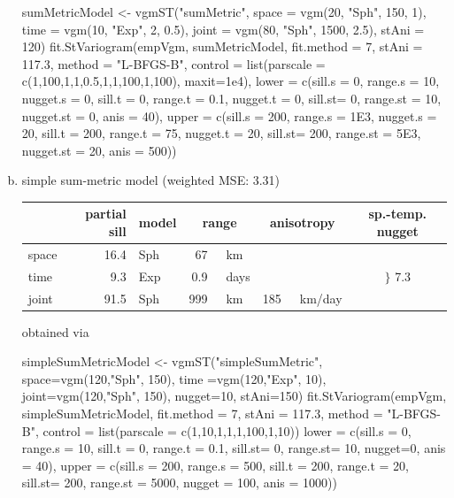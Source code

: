\begin{enumerate}[a)]
\begin{example*}
sumMetricModel <- vgmST("sumMetric",
                        space = vgm(20, "Sph", 150, 1),
                        time = vgm(10, "Exp", 2, 0.5),
                        joint = vgm(80, "Sph", 1500, 2.5),
                        stAni = 120)
fit.StVariogram(empVgm, sumMetricModel, fit.method = 7, 
                stAni = 117.3, method = "L-BFGS-B", 
                control = list(parscale = c(1,100,1,1,0.5,1,1,100,1,100),
                               maxit=1e4),
                lower = c(sill.s = 0,  range.s = 10,  nugget.s = 0,
                          sill.t = 0,  range.t = 0.1,   nugget.t = 0,
                          sill.st= 0, range.st = 10, nugget.st = 0, 
                          anis = 40),
                upper = c(sill.s = 200,  range.s = 1E3,  nugget.s = 20,
                          sill.t = 200,  range.t = 75,   nugget.t = 20,
                          sill.st= 200, range.st = 5E3, nugget.st = 20,
                          anis = 500))
\end{example*}

\item 
simple sum-metric model (weighted MSE: 3.31)

\nopagebreak
\begin{tabular}{l|rlrlrlc}
\toprule
          & partial sill & model & \multicolumn{2}{c}{range} & \multicolumn{2}{c}{anisotropy} & sp.-temp. nugget \\ \midrule  
space  & 16.4 & Sph & 67   & \hspace{-2\tabcolsep}~km     & & & \multirow{3}{*}{$\Bigg\}$ 7.3} \\
time    & 9.3 & Exp & 0.9 & \hspace{-2\tabcolsep}~days & & & \\
joint    & 91.5 & Sph & 999 & \hspace{-2\tabcolsep}~km      & 185 & \hspace{-2\tabcolsep}~km/day &  \\ \bottomrule
\end{tabular}

obtained via

\begin{example*}
simpleSumMetricModel <- vgmST("simpleSumMetric",
                              space=vgm(120,"Sph", 150),
                              time =vgm(120,"Exp", 10),
                              joint=vgm(120,"Sph", 150),
                              nugget=10, stAni=150)
fit.StVariogram(empVgm, simpleSumMetricModel, fit.method = 7,
                stAni = 117.3, method = "L-BFGS-B",
                control = list(parscale = c(1,10,1,1,1,100,1,10))
                lower = c(sill.s = 0, range.s = 10,
                          sill.t = 0, range.t = 0.1,
                          sill.st= 0, range.st= 10,
                          nugget=0, anis = 40),
                upper = c(sill.s = 200,  range.s = 500,
                          sill.t = 200,  range.t = 20,
                          sill.st= 200, range.st = 5000,
                          nugget = 100, anis = 1000))
\end{example*}
\end{enumerate}

